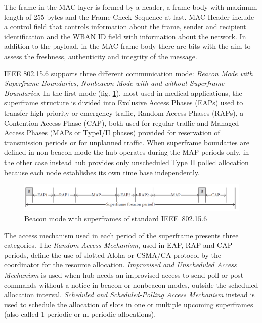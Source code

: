 \documentclass[conference]{IEEEtran}
\begin{document}
The frame in the MAC layer is formed by a header, a frame body with maximum length of 255 bytes and the Frame Check Sequence at last. MAC Header include a control field that controls information about the frame, sender and recipient identification and the WBAN ID field with information about the network. In addition to the payload, in the MAC frame body there are bits with the aim to assess the freshness, authenticity and integrity of the message.

IEEE 802.15.6 supports three different communication mode: \textit{Beacon Mode with Superframe Boundaries, Nonbeacon Mode with and without Superframe Boundaries}. In the first mode (fig. \ref{fig_beaconModeSuperframe}), most used in medical applications, the superframe structure is divided into Exclusive Access Phases (EAPs) used to transfer high-priority or emergency traffic, Random Access Phases (RAPs), a Contention Access Phase (CAP), both used for regular traffic and Managed Access Phases (MAPs or TypeI/II phases) provided for reservation of transmission periods or for unplanned traffic. When superframe boundaries are defined in non beacon mode the hub operates during the MAP periods only, in the other case instead hub provides only unscheduled Type II polled allocation because each node establishes its own time base independently.

\begin{figure}[htbp]
	\centering
	\includegraphics[width=0.9\linewidth]{img/beaconModeSuperframe.png}
	\caption{Beacon mode with superframes of standard IEEE~802.15.6}
	\label{fig_beaconModeSuperframe}
\end{figure}

The access mechanism used in each period of the superframe presents three categories. The \textit{Random Access Mechanism}, used in EAP, RAP and CAP periods, define the use of slotted Aloha or CSMA/CA protocol by the coordinator for the resource allocation. \textit{Improvised and Unscheduled Access Mechanism} is used when hub needs an improvised access to send poll or post commands without a notice in beacon or nonbeacon modes, outside the scheduled allocation interval. \textit{Scheduled and Scheduled-Polling Access Mechanism} instead is used to schedule the allocation of slots in one or multiple upcoming superframes (also called 1-periodic or m-periodic allocations). \cite{kwak2010overview} \cite{ullah2013review}
\end{document}
